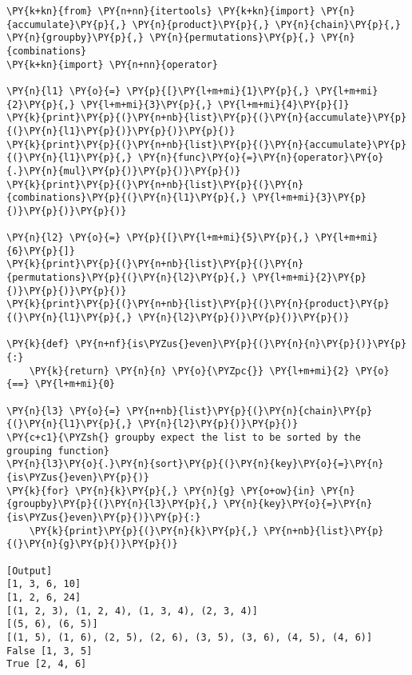 \begin{Verbatim}[label=\makebox{\url{https://github.com/lucabaldini/cmepda/tree/master/slides/latex/snippets/itertools\_showcase.py}},commandchars=\\\{\}]
\PY{k+kn}{from} \PY{n+nn}{itertools} \PY{k+kn}{import} \PY{n}{accumulate}\PY{p}{,} \PY{n}{product}\PY{p}{,} \PY{n}{chain}\PY{p}{,} \PY{n}{groupby}\PY{p}{,} \PY{n}{permutations}\PY{p}{,} \PY{n}{combinations}
\PY{k+kn}{import} \PY{n+nn}{operator}

\PY{n}{l1} \PY{o}{=} \PY{p}{[}\PY{l+m+mi}{1}\PY{p}{,} \PY{l+m+mi}{2}\PY{p}{,} \PY{l+m+mi}{3}\PY{p}{,} \PY{l+m+mi}{4}\PY{p}{]}
\PY{k}{print}\PY{p}{(}\PY{n+nb}{list}\PY{p}{(}\PY{n}{accumulate}\PY{p}{(}\PY{n}{l1}\PY{p}{)}\PY{p}{)}\PY{p}{)}
\PY{k}{print}\PY{p}{(}\PY{n+nb}{list}\PY{p}{(}\PY{n}{accumulate}\PY{p}{(}\PY{n}{l1}\PY{p}{,} \PY{n}{func}\PY{o}{=}\PY{n}{operator}\PY{o}{.}\PY{n}{mul}\PY{p}{)}\PY{p}{)}\PY{p}{)}
\PY{k}{print}\PY{p}{(}\PY{n+nb}{list}\PY{p}{(}\PY{n}{combinations}\PY{p}{(}\PY{n}{l1}\PY{p}{,} \PY{l+m+mi}{3}\PY{p}{)}\PY{p}{)}\PY{p}{)}

\PY{n}{l2} \PY{o}{=} \PY{p}{[}\PY{l+m+mi}{5}\PY{p}{,} \PY{l+m+mi}{6}\PY{p}{]}
\PY{k}{print}\PY{p}{(}\PY{n+nb}{list}\PY{p}{(}\PY{n}{permutations}\PY{p}{(}\PY{n}{l2}\PY{p}{,} \PY{l+m+mi}{2}\PY{p}{)}\PY{p}{)}\PY{p}{)}
\PY{k}{print}\PY{p}{(}\PY{n+nb}{list}\PY{p}{(}\PY{n}{product}\PY{p}{(}\PY{n}{l1}\PY{p}{,} \PY{n}{l2}\PY{p}{)}\PY{p}{)}\PY{p}{)}

\PY{k}{def} \PY{n+nf}{is\PYZus{}even}\PY{p}{(}\PY{n}{n}\PY{p}{)}\PY{p}{:}
    \PY{k}{return} \PY{n}{n} \PY{o}{\PYZpc{}} \PY{l+m+mi}{2} \PY{o}{==} \PY{l+m+mi}{0}

\PY{n}{l3} \PY{o}{=} \PY{n+nb}{list}\PY{p}{(}\PY{n}{chain}\PY{p}{(}\PY{n}{l1}\PY{p}{,} \PY{n}{l2}\PY{p}{)}\PY{p}{)}
\PY{c+c1}{\PYZsh{} groupby expect the list to be sorted by the grouping function}
\PY{n}{l3}\PY{o}{.}\PY{n}{sort}\PY{p}{(}\PY{n}{key}\PY{o}{=}\PY{n}{is\PYZus{}even}\PY{p}{)}
\PY{k}{for} \PY{n}{k}\PY{p}{,} \PY{n}{g} \PY{o+ow}{in} \PY{n}{groupby}\PY{p}{(}\PY{n}{l3}\PY{p}{,} \PY{n}{key}\PY{o}{=}\PY{n}{is\PYZus{}even}\PY{p}{)}\PY{p}{:}
    \PY{k}{print}\PY{p}{(}\PY{n}{k}\PY{p}{,} \PY{n+nb}{list}\PY{p}{(}\PY{n}{g}\PY{p}{)}\PY{p}{)}

[Output]
[1, 3, 6, 10]
[1, 2, 6, 24]
[(1, 2, 3), (1, 2, 4), (1, 3, 4), (2, 3, 4)]
[(5, 6), (6, 5)]
[(1, 5), (1, 6), (2, 5), (2, 6), (3, 5), (3, 6), (4, 5), (4, 6)]
False [1, 3, 5]
True [2, 4, 6]
\end{Verbatim}